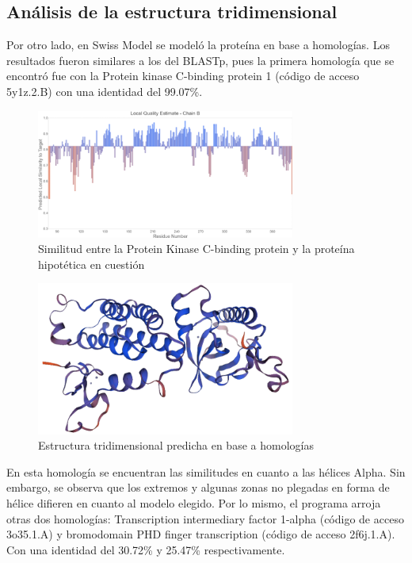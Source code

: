 \documentclass[journal,transmag]{IEEEtran}
\begin{document}
\subsection{\textbf{ Análisis de la estructura tridimensional}}
Por otro lado, en Swiss Model se modeló la proteína en base a homologías. Los resultados fueron similares a los del BLASTp, pues la primera homología que se encontró fue con la Protein kinase C-binding protein 1 (código de acceso 5y1z.2.B) con una identidad del 99.07\%. 



\begin{figure}[!h]
	\center
	\includegraphics[width=8.5cm]{imagenes/barras.png}
	\caption{Similitud entre la Protein Kinase C-binding protein y la proteína hipotética en cuestión}
	\label{11}
\end{figure}

\begin{figure}[!h]
	\center
	\includegraphics[width=8.5cm]{imagenes/swiss.png}
	\caption{Estructura tridimensional predicha en base a homologías}
	\label{12}
\end{figure}


En esta homología se encuentran las similitudes en cuanto a las hélices Alpha. Sin embargo, se observa que los extremos y algunas zonas no plegadas en forma de hélice difieren en cuanto al modelo elegido. Por lo mismo, el programa arroja otras dos homologías: Transcription intermediary factor 1-alpha (código de acceso 3o35.1.A) y bromodomain PHD finger transcription (código de acceso 2f6j.1.A). Con una identidad del 30.72\% y 25.47\% respectivamente.  
\end{document}

